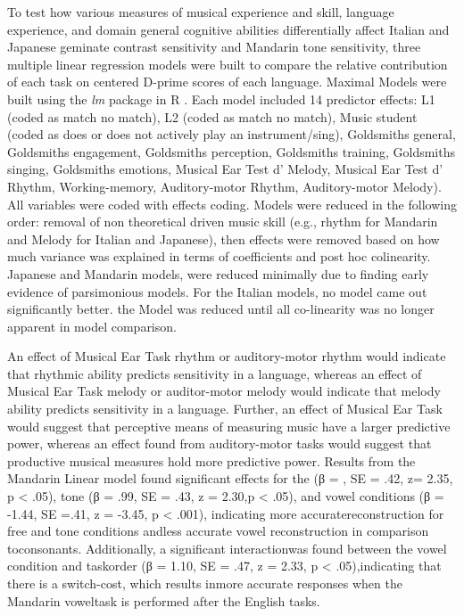 \documentclass[a4paper]{article}
\newcommand{\livedata}[2]{%
    \DTLfetch{#1}{Statistic}{#2}{Value}%
}
\begin{document}
To test how various measures of musical experience and skill, language experience, and domain general cognitive abilities differentially affect Italian and Japanese geminate contrast sensitivity and Mandarin tone sensitivity, three multiple linear regression models were built to compare the relative contribution of each task on centered D-prime scores of each language. Maximal Models were built using the \textit{lm} package \cite{lmPackage} in R \cite{RManual}. Each model included 14 predictor effects: L1 (coded as match no match), L2 (coded as match no match), Music student (coded as does or does not actively play an instrument/sing), Goldsmiths general, Goldsmiths engagement, Goldsmiths perception, Goldsmiths training, Goldsmiths singing, Goldsmiths emotions, Musical Ear Test d' Melody, Musical Ear Test d' Rhythm, Working-memory, Auditory-motor Rhythm, Auditory-motor Melody). All variables were coded with effects coding. Models were reduced in the following order: removal of non theoretical driven music skill (e.g., rhythm for Mandarin and Melody for Italian and Japanese), then effects were removed based on how much variance was explained in terms of coefficients and post hoc colinearity. Japanese and Mandarin models, were reduced minimally due to finding early evidence of parsimonious models. For the Italian models, no model came out significantly better. the Model was reduced until all co-linearity was no longer apparent in model comparison. 

An effect of Musical Ear Task rhythm or auditory-motor rhythm would indicate that rhythmic ability predicts sensitivity in a language, whereas an effect of Musical Ear Task melody or auditor-motor melody would indicate that melody ability predicts sensitivity in a language. Further, an effect of Musical Ear Task would suggest that perceptive means of measuring music have a larger predictive power, whereas an effect found from auditory-motor tasks would suggest that productive musical measures hold more predictive power. Results from the Mandarin Linear model found significant effects for the (β = \livedata{modelsouts}{Mandarin.(intercept)}, SE = .42, z= 2.35, p < .05), tone (β = .99, SE = .43, z = 2.30,p < .05), and vowel conditions (β = -1.44, SE =.41, z = -3.45, p < .001), indicating more accuratereconstruction for free and tone conditions andless accurate vowel reconstruction in comparison toconsonants. Additionally, a significant interactionwas found between the vowel condition and taskorder (β = 1.10, SE = .47, z = 2.33, p < .05),indicating that there is a switch-cost, which results inmore accurate responses when the Mandarin voweltask is performed after the English tasks. 
\end{document}
